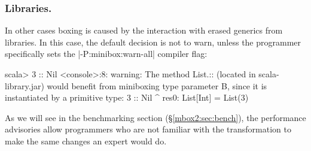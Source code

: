 \subsubsection*{Libraries.} In other cases boxing is caused by the interaction with erased generics from libraries. In this case, the default decision is not to warn, unless the programmer specifically sets the |-P:minibox:warn-all| compiler flag:

\begin{lstlisting-nobreak-nolang}
 scala> 3 :: Nil
 <console>:8: warning: The method List.:: (located in scala-library.jar) would benefit from miniboxing type parameter B, since it is instantiated by a primitive type:
               3 :: Nil
                 ^
 res0: List[Int] = List(3)
\end{lstlisting-nobreak-nolang}

As we will see in the benchmarking section (\S\ref{mbox2:sec:bench}), the performance advisories allow programmers who are not familiar with the transformation to make the same changes an expert would do.
